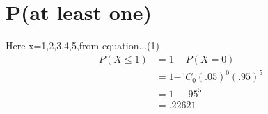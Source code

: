 \documentclass[11pt,a4paper,twocolumn]{article}
\begin{document}
\section{P(at least one)}
Here x=1,2,3,4,5,from equation...(1)
\begin{align*}
P(X\leq1)&=1-P(X=0)\\
&=1-^{5}C_0(.05)^{0}(.95)^{5}\\
&=1-.95^{5}\\
&=.22621
\end{align*}
\end{document}
